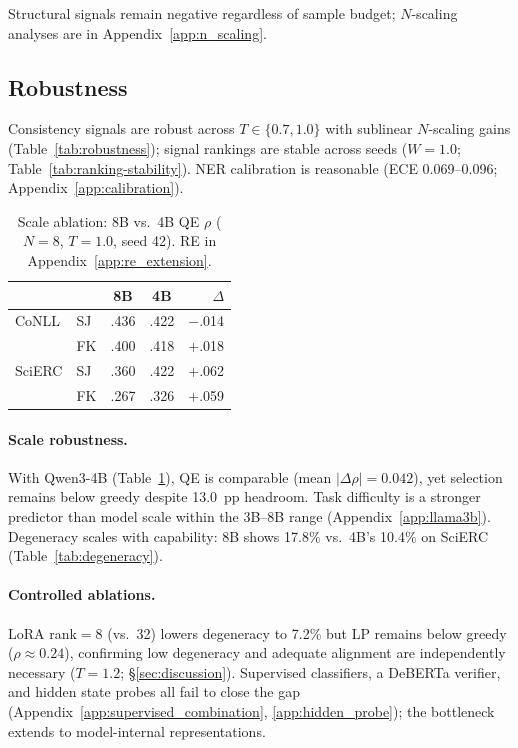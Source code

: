 Structural signals remain negative regardless of sample budget; $N$-scaling analyses are in Appendix~\ref{app:n_scaling}.

\subsection{Robustness}
\label{sec:robustness_main}

Consistency signals are robust across $T{\in}\{0.7, 1.0\}$ with sublinear $N$-scaling gains (Table~\ref{tab:robustness}); signal rankings are stable across seeds ($W{=}1.0$; Table~\ref{tab:ranking-stability}). NER calibration is reasonable (ECE 0.069--0.096; Appendix~\ref{app:calibration}).

\begin{table}[t]
\centering
\small
\caption{Scale ablation: 8B vs.\ 4B QE $\rho$ ($N{=}8$, $T{=}1.0$, seed 42). RE in Appendix~\ref{app:re_extension}.}
\label{tab:scale_ablation}
\begin{tabular}{@{}ll cc r@{}}
\toprule
& & \textbf{8B} & \textbf{4B} & $\Delta$ \\
\midrule
CoNLL & SJ & .436 & .422 & $-$.014 \\
      & FK & .400 & .418 & $+$.018 \\
SciERC & SJ & .360 & .422 & $+$.062 \\
       & FK & .267 & .326 & $+$.059 \\
\bottomrule
\end{tabular}
\end{table}

\paragraph{Scale robustness.}
With Qwen3-4B (Table~\ref{tab:scale_ablation}), QE is comparable (mean $|\Delta\rho|{=}0.042$), yet selection remains below greedy despite 13.0~pp headroom. Task difficulty is a stronger predictor than model scale within the 3B--8B range (Appendix~\ref{app:llama3b}).
Degeneracy scales with capability: 8B shows 17.8\% vs.\ 4B's 10.4\% on SciERC (Table~\ref{tab:degeneracy}).

\paragraph{Controlled ablations.}
LoRA rank${=}8$ (vs.\ 32) lowers degeneracy to 7.2\% but LP remains below greedy ($\rho{\approx}0.24$), confirming low degeneracy and adequate alignment are independently necessary ($T{=}1.2$; \S\ref{sec:discussion}).
Supervised classifiers, a DeBERTa verifier, and hidden state probes all fail to close the gap (Appendix~\ref{app:supervised_combination}, \ref{app:hidden_probe}); the bottleneck extends to model-internal representations.

